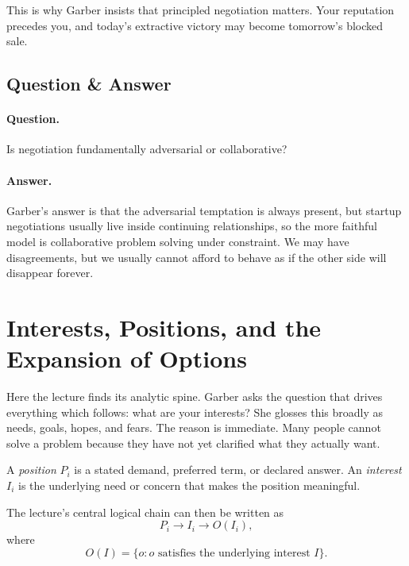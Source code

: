 This is why Garber insists that principled negotiation matters. Your reputation precedes you, and today's extractive victory may become tomorrow's blocked sale.

\subsection{Question \& Answer}

\paragraph{Question.} Is negotiation fundamentally adversarial or collaborative?

\paragraph{Answer.} Garber's answer is that the adversarial temptation is always present, but startup negotiations usually live inside continuing relationships, so the more faithful model is collaborative problem solving under constraint. We may have disagreements, but we usually cannot afford to behave as if the other side will disappear forever.

\section{Interests, Positions, and the Expansion of Options}

Here the lecture finds its analytic spine. Garber asks the question that drives everything which follows: what are your interests? She glosses this broadly as needs, goals, hopes, and fears. The reason is immediate. Many people cannot solve a problem because they have not yet clarified what they actually want.

\begin{definition}
A \emph{position} \(P_i\) is a stated demand, preferred term, or declared answer. An \emph{interest} \(I_i\) is the underlying need or concern that makes the position meaningful.
\end{definition}

The lecture's central logical chain can then be written as
\begin{equation}
P_i \longrightarrow I_i \longrightarrow O(I_i),
\end{equation}
where
\begin{equation}
O(I) = \{o : o \text{ satisfies the underlying interest } I\}.
\end{equation}

